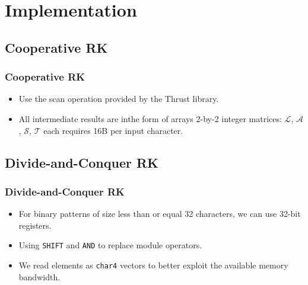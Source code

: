 \section{Implementation}

\subsection{Cooperative RK}
\begin{frame}
	\frametitle{Cooperative RK}
	\begin{itemize}
		\setlength\itemsep{1em}
		\item Use the scan operation provided by the Thrust library.
		\item All intermediate results are inthe form of arrays 2-by-2 
		integer matrices: $\mathcal{L}$, $\mathcal{A}$, $\mathcal{S}$,
		$\mathcal{T}$ each requires 16B per input character.
	\end{itemize}
\end{frame}

\subsection{Divide-and-Conquer RK}
\begin{frame}
	\frametitle{Divide-and-Conquer RK}
	\begin{itemize}
		\setlength\itemsep{1em}
		\item For binary patterns of size less than or equal 32 
		characters, we can use 32-bit registers.
		\item Using \texttt{SHIFT} and \texttt{AND} to replace module operators.
		\item We read elements as \texttt{char4} vectors to better
		exploit the available memory bandwidth.
	\end{itemize}
\end{frame}